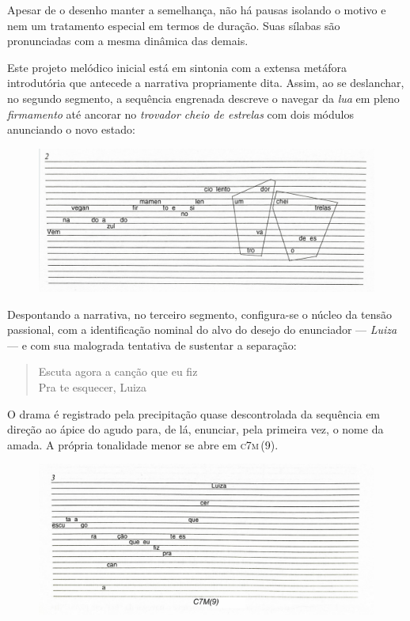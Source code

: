 Apesar de o desenho manter a semelhança, não há pausas isolando o motivo
e nem um tratamento especial em termos de duração. Suas sílabas são
pronunciadas com a mesma dinâmica das demais.

Este projeto melódico inicial está em sintonia com a extensa metáfora
introdutória que antecede a narrativa propriamente dita. Assim, ao se
deslanchar, no segundo segmento, a sequência engrenada descreve o
navegar da \textit{lua} em pleno \textit{firmamento} até ancorar no \textit{trovador
cheio de estrelas} com dois módulos anunciando o novo estado:

\begin{figure}[H]
\includegraphics[width=\textwidth]{./imgs/figura27.jpg}
\end{figure}

Despontando a narrativa, no terceiro segmento, configura-se o núcleo da
tensão passional, com a identificação nominal do alvo do desejo do
enunciador --- \textit{Luiza} --- e com sua malograda tentativa de sustentar a
separação:

\begin{verse}
\small{Escuta agora a canção que eu fiz\\
Pra te esquecer, Luiza}
\end{verse}

O drama é registrado pela precipitação quase descontrolada da sequência
em direção ao ápice do agudo para, de lá, enunciar, pela primeira vez, o
nome da amada. A própria tonalidade menor se abre em \textsc{c7m}\,(9).

\begin{figure}[H]
\includegraphics[width=\textwidth]{./imgs/figura28.jpg}
\end{figure}

